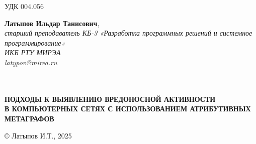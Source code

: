 \documentclass[a4paper,14pt]{extarticle}
\begin{document}
\pagestyle{empty}
\noindent УДК 004.056

\noindent\hfill
\begin{minipage}{0.75\textwidth}
\raggedleft
\textbf{Латыпов Ильдар Танисович},\\
\textit{старший преподаватель КБ-3 «Разработка программных решений и системное программирование»\\}
\textit{ИКБ РТУ МИРЭА}\\
\textit{latypov@mirea.ru}
\textit{ }\\
\textit{ }\\
\textit{ }\\
\end{minipage}



\begin{center}
{\fontsize{15}{18}\selectfont\bfseries
ПОДХОДЫ К ВЫЯВЛЕНИЮ ВРЕДОНОСНОЙ АКТИВНОСТИ\\
В КОМПЬЮТЕРНЫХ СЕТЯХ С ИСПОЛЬЗОВАНИЕМ АТРИБУТИВНЫХ МЕТАГРАФОВ}
\end{center}

\vspace{1em}








\printbibliography[title={Список источников и литературы}]

\noindent\raggedleft © Латыпов И.Т., 2025
\end{document}

